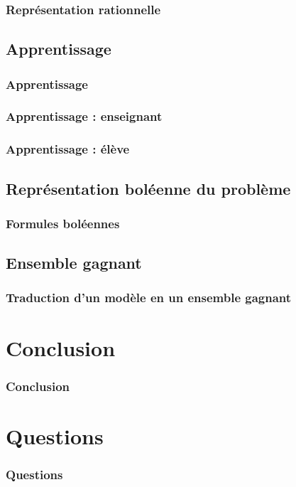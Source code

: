 \documentclass{beamer}
\begin{document}
\begin{frame}
\frametitle{Représentation rationnelle}
\end{frame}

\subsection{Apprentissage}
\begin{frame}
\frametitle{Apprentissage}
\end{frame}

\begin{frame}
\frametitle{Apprentissage : enseignant} %
\end{frame}

\begin{frame}
\frametitle{Apprentissage : élève} %
\end{frame}

\subsection{Représentation boléenne du problème}
\begin{frame}
\frametitle{Formules boléennes} %
\end{frame}

\subsection{Ensemble gagnant}
\begin{frame}
\frametitle{Traduction d'un modèle en un ensemble gagnant}
\end{frame}

\section{Conclusion}
\begin{frame}
\frametitle{Conclusion}
\end{frame}

\section{Questions}
\begin{frame}
\frametitle{Questions}
\end{frame}
\end{document}
